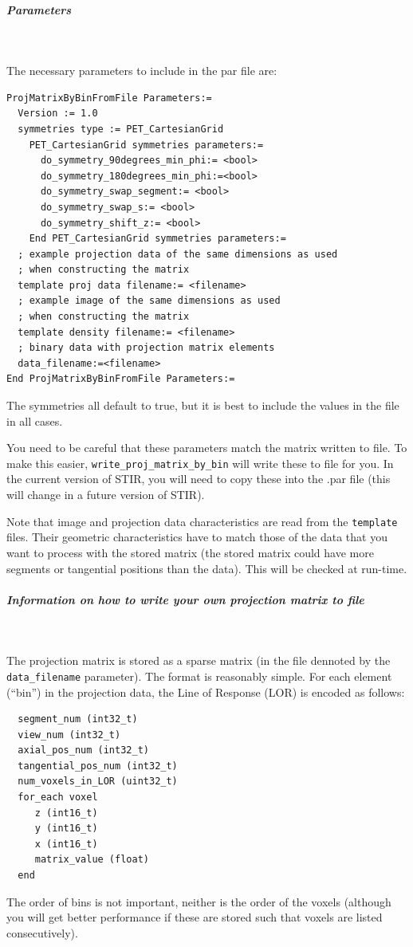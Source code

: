 \documentclass{article}
\newcommand{\subsubsubsubsection}[1]{\subparagraph{#1} \mbox{} \\}
\begin{document}
{{{{{{{ \subsubsubsubsection{Parameters}
}
The necessary parameters to include in the par file are:
\begin{verbatim}
ProjMatrixByBinFromFile Parameters:=
  Version := 1.0
  symmetries type := PET_CartesianGrid
    PET_CartesianGrid symmetries parameters:=
      do_symmetry_90degrees_min_phi:= <bool>
      do_symmetry_180degrees_min_phi:=<bool>
      do_symmetry_swap_segment:= <bool>
      do_symmetry_swap_s:= <bool>
      do_symmetry_shift_z:= <bool>
    End PET_CartesianGrid symmetries parameters:=
  ; example projection data of the same dimensions as used 
  ; when constructing the matrix
  template proj data filename:= <filename>
  ; example image of the same dimensions as used 
  ; when constructing the matrix
  template density filename:= <filename>
  ; binary data with projection matrix elements
  data_filename:=<filename> 
End ProjMatrixByBinFromFile Parameters:=
\end{verbatim}
The symmetries all default to true, but it is best to include the values in the file in all cases. 

You need to be careful that these parameters match the matrix written to file. To make this easier,
\texttt{write\_proj\_matrix\_by\_bin} will write these to file for you. In the current version
of STIR, you will need to copy these into the .par file (this will change in a future version of STIR).

Note that image and projection data characteristics are read from the \texttt{template} files. Their geometric
characteristics have to match those of the data that you want to process with the stored matrix
(the stored matrix could have more segments or tangential positions than the data). This will be
checked at run-time.

{ \subsubsubsubsection{Information on how to write your own projection matrix to file}
}
The projection matrix is stored as a sparse matrix (in the file dennoted by the \texttt{data\_filename}
parameter). The format is reasonably simple. For each element (``bin'') in the projection data, the 
Line of Response (LOR) is encoded as follows:
\begin{verbatim}
  segment_num (int32_t)
  view_num (int32_t)
  axial_pos_num (int32_t)
  tangential_pos_num (int32_t)
  num_voxels_in_LOR (uint32_t)
  for_each voxel
     z (int16_t)
     y (int16_t)
     x (int16_t)
     matrix_value (float)
  end
\end{verbatim}
The order of bins is not important, neither is the order of the voxels (although you will get better
performance if these are stored such that voxels are listed consecutively).

}}}}}}
\end{document}
